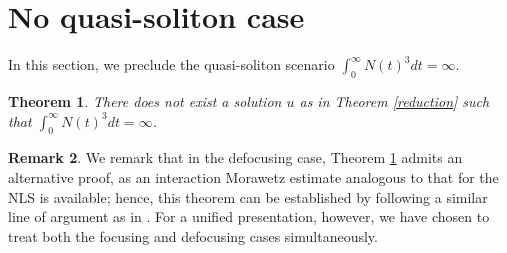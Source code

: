 \documentclass[reqno,11pt]{amsart}
\theoremstyle{plain}
\newtheorem{theorem}{Theorem}
\theoremstyle{definition}
\newtheorem{remark}[theorem]{Remark}
\numberwithin{equation}{section}
\numberwithin{theorem}{section}
\begin{document}
\section{No quasi-soliton case}\label{quasisec}

In this section, we preclude the quasi-soliton scenario $\int_{0}^{\infty} N(t)^{3} d t=\infty$.



\begin{theorem}\label{quasi}
    There does not exist a solution $u$ as in Theorem \ref{reduction}  such that $\int_{0}^{\infty} N(t)^{3} d t= \infty$.
\end{theorem}

\begin{remark}
    We remark that in the defocusing case, Theorem \ref{quasi} admits an alternative proof, as an interaction Morawetz estimate analogous to that for the NLS is available; hence, this theorem can be established by following a similar line of argument as in \cite{Dodson-JAMS, Dodson-AJM, Dodson-Duke}. For a unified presentation, however, we have chosen to treat both the focusing and defocusing cases simultaneously.
\end{remark}
\end{document}
